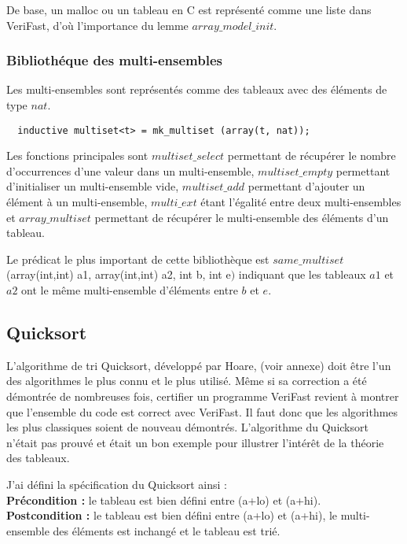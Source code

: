 \documentclass[11pt,openany]{article}
\newcommand{\verifast}{VeriFast}
\begin{document}
			De base, un malloc ou un tableau en C est repr\'esent\'e comme une liste dans \verifast, d'o\`u l'importance du lemme $array\_model\_init$.
			\subsubsection{Biblioth\'eque des multi-ensembles}
			Les multi-ensembles sont repr\'esent\'es comme des tableaux avec des \'el\'ements de type $nat$.
			\begin{lstlisting}
  inductive multiset<t> = mk_multiset (array(t, nat));
			\end{lstlisting}
			Les fonctions principales sont $multiset\_select$ permettant de r\'ecup\'erer le nombre d'occurrences d'une valeur dans un multi-ensemble, $multiset\_empty$ permettant d'initialiser un multi-ensemble vide, $multiset\_add$ permettant d'ajouter un \'el\'ement \`a un multi-ensemble, $multi\_ext$ \'etant l'\'egalit\'e entre deux multi-ensembles et $array\_multiset$ permettant de r\'ecup\'erer le multi-ensemble des \'el\'ements d'un tableau.
			
			Le pr\'edicat le plus important de cette biblioth\`eque est $same\_multiset$(array(int,int) a1, array(int,int) a2, int b, int e$)$ indiquant que les tableaux $a1$ et $a2$ ont le m\^eme multi-ensemble d'\'el\'ements entre $b$ et $e$.
			
	\subsection{Quicksort}
		L'algorithme de tri Quicksort, d\'evelopp\'e par Hoare, (voir annexe) doit \^etre l'un des algorithmes le plus connu et le plus utilis\'e. M\^eme si sa correction a \'et\'e d\'emontr\'ee de nombreuses fois, certifier un programme \verifast{} revient \`a montrer que l'ensemble du code est correct avec \verifast. Il faut donc que les algorithmes les plus classiques soient de nouveau d\'emontr\'es. L'algorithme du Quicksort n'\'etait pas prouv\'e et \'etait un bon exemple pour illustrer l'int\'er\^et de la th\'eorie des tableaux. 
		
		J'ai d\'efini la sp\'ecification du Quicksort ainsi :\\
		\textbf{Pr\'econdition :} le tableau est bien d\'efini entre (a+lo) et (a+hi).\\
		\textbf{Postcondition :} le tableau est bien d\'efini entre (a+lo) et (a+hi), le multi-ensemble des \'el\'ements est inchang\'e et le tableau est tri\'e.
		
\end{document}
